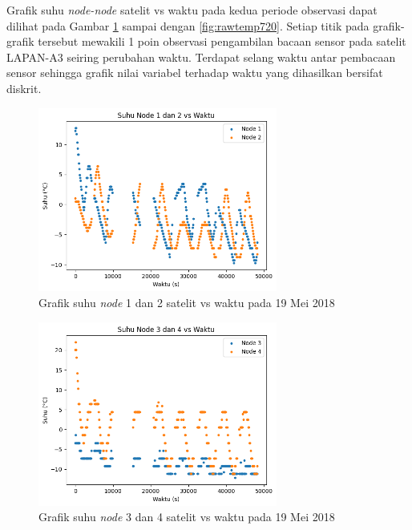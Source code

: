 Grafik suhu \textit{node-node} satelit vs waktu pada kedua periode observasi
dapat dilihat pada Gambar \ref{fig:rawtemp1219} sampai dengan
\ref{fig:rawtemp720}. Setiap titik pada grafik-grafik tersebut mewakili 1 poin
observasi pengambilan bacaan sensor pada satelit LAPAN-A3 seiring perubahan
waktu. Terdapat selang waktu antar pembacaan sensor sehingga grafik nilai
variabel terhadap waktu yang dihasilkan bersifat diskrit.

\begin{figure}[H]
\setlength{}
\begin{center}
\includegraphics[width=0.7\textwidth]{fig/raw_node12_temp_2018-05-19.png}
	\caption{Grafik suhu \textit{node} 1 dan 2 satelit vs waktu pada 19 Mei 2018}
\label{fig:rawtemp1219}
\end{center}
\end{figure}

\begin{figure}[H]
\setlength{}
\begin{center}
\includegraphics[width=0.7\textwidth]{fig/raw_node34_temp_2018-05-19.png}
	\caption{Grafik suhu \textit{node} 3 dan 4 satelit vs waktu pada 19 Mei 2018}
\label{fig:rawtemp3419}
\end{center}
\end{figure}

